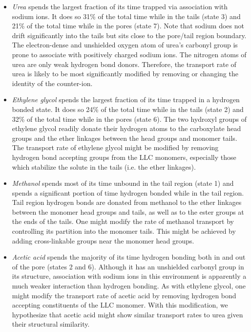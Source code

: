 \documentclass[journal=ancac3,manuscript=article,layout=twocolumn]{achemso}
\begin{document}

  \begin{itemize}
  \item \textit{Urea} spends the largest fraction of its time trapped via association with
  sodium ions. It does so 31\% of the total time while in the tails (state 3)
  and 21\% of the total time while in the pores (state 7). Note that sodium
  does not drift significantly into the tails but sits close to the pore/tail
  region boundary. The electron-dense and unshielded oxygen atom of urea's
  carbonyl group is prone to associate with positively charged sodium ions. The
  nitrogen atoms of urea are only weak hydrogen bond donors. Therefore, the
  transport rate of urea is likely to be most significantly modified by
  removing or changing the identity of the counter-ion.
  
  \item \textit{Ethylene glycol} spends the largest fraction of its time trapped in a hydrogen
  bonded state. It does so 24\% of the total time while in the tails (state 2)
  and 32\% of the total time while in the pores (state 6). The two hydroxyl
  groups of ethylene glycol readily donate their hydrogen atoms to the
  carboxylate head groups and the ether linkages between the head groups and
  monomer tails. The transport rate of ethylene glycol might be modified by
  removing hydrogen bond accepting groups from the LLC monomers, especially
  those which stabilize the solute in the tails (i.e. the ether linkages). 
  
  \item \textit{Methanol} spends most of its time unbound in the tail region (state 1) and
  spends a significant portion of time hydrogen bonded while in the tail
  region. Tail region hydrogen bonds are donated from methanol to the ether
  linkages between the monomer head groups and tails, as well as to the ester groups
  at the ends of the tails. One might modify the
  rate of methanol transport by controlling its partition into the monomer
  tails. This might be achieved by adding cross-linkable groups near the
  monomer head groups.
  
  \item \textit{Acetic acid} spends the majority of its time hydrogen bonding both in
  and out of the pore (states 2 and 6). Although it has an unshielded carbonyl
  group in its structure, association with sodium ions in this environment is
  apparently a much weaker interaction than hydrogen bonding.  As with ethylene
  glycol, one might modify the transport rate of acetic acid by removing
  hydrogen bond accepting constituents of the LLC monomer. With this
  modification, we hypothesize that acetic acid might show similar transport
  rates to urea given their structural similarity.
  \end{itemize}
  
\end{document}

